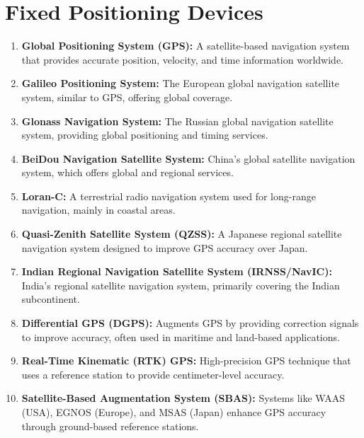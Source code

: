 \documentclass{article}
\begin{document}
\section*{Fixed Positioning Devices}
\begin{enumerate}
    \item \textbf{Global Positioning System (GPS):} A satellite-based navigation system that provides accurate position, velocity, and time information worldwide.
    
    \item \textbf{Galileo Positioning System:} The European global navigation satellite system, similar to GPS, offering global coverage.
    
    \item \textbf{Glonass Navigation System:} The Russian global navigation satellite system, providing global positioning and timing services.
    
    \item \textbf{BeiDou Navigation Satellite System:} China's global satellite navigation system, which offers global and regional services.
    
    \item \textbf{Loran-C:} A terrestrial radio navigation system used for long-range navigation, mainly in coastal areas.
    
    \item \textbf{Quasi-Zenith Satellite System (QZSS):} A Japanese regional satellite navigation system designed to improve GPS accuracy over Japan.
    
    \item \textbf{Indian Regional Navigation Satellite System (IRNSS/NavIC):} India's regional satellite navigation system, primarily covering the Indian subcontinent.
    
    \item \textbf{Differential GPS (DGPS):} Augments GPS by providing correction signals to improve accuracy, often used in maritime and land-based applications.
    
    \item \textbf{Real-Time Kinematic (RTK) GPS:} High-precision GPS technique that uses a reference station to provide centimeter-level accuracy.
    
    \item \textbf{Satellite-Based Augmentation System (SBAS):} Systems like WAAS (USA), EGNOS (Europe), and MSAS (Japan) enhance GPS accuracy through ground-based reference stations.
    

\end{enumerate}
\end{document}
